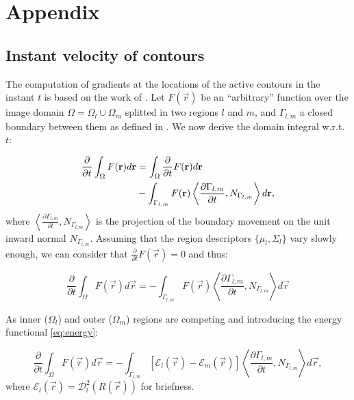 \renewcommand{\theequation}{A.\arabic{equation}}
\renewcommand{\thesubsection}{Appendix \arabic{subsection}}

\section*{Appendix}

\subsection{Instant velocity of contours}
\label{app:shape_priors}
The computation of gradients at the locations of the active contours in the
  instant $t$ is based on the work of \cite{herbulot_segmentation_2006}.
Let $F(\vec{r})$ be an ``arbitrary'' function over the image domain
  $\Omega = \Omega_l \cup \Omega_m$ splitted in two regions $l$ and
  $m$, and $\Gamma_{l,m}$ a closed boundary between them
  as defined in .
We now derive the domain integral w.r.t. $t$:

  \begin{align*}
  \frac{\partial}{\partial t} \int_\Omega F(\vec{r}) d\vec{r} &=
  \int_\Omega \frac{\partial}{\partial t}F(\vec{r}) d\vec{r} \notag\\
  &- \int_{\Gamma_{l,m}} F(\vec{r}) \left\langle \frac{\partial \Gamma_{l,m} }{\partial t},
  N_{\Gamma_{l,m}}\right\rangle d\vec{r},
  \end{align*}
%
  where $\left\langle\frac{\partial\Gamma_{l,m}}{\partial t}, N_{\Gamma_{l,m}}\right\rangle$ is
  the projection of the boundary movement on the unit inward normal $N_{\Gamma_{l,m}}$.
Assuming that the region descriptors $\{\mu_l, \Sigma_l\}$ vary slowly enough, we can consider
  that $\frac{\partial}{\partial t} F(\vec{r}) = 0$ and thus:

  \begin{equation}
  \frac{\partial}{\partial t} \int_\Omega F(\vec{r}) d\vec{r} =
  - \int_{\Gamma_{l,m}} F(\vec{r}) \left\langle \frac{\partial \Gamma_{l,m} }{\partial t},
  N_{\Gamma_{l,m}}\right\rangle d\vec{r}
  \label{eq:shape_gradient_orig}
  \end{equation}

  As inner ($\Omega_l$) and outer ($\Omega_m$) regions are competing and introducing
    the energy functional \eqref{eq:energy}:

    \begin{equation}
    \frac{\partial}{\partial t} \int_\Omega F(\vec{r}) d\vec{r} =
    - \int_{\Gamma_{l,m}} \left[ \mathcal{E}_{l}(\vec{r}) - \mathcal{E}_{m}(\vec{r}) \right]
    \left\langle \frac{\partial \Gamma_{l,m} }{\partial t},
  N_{\Gamma_{l,m}}\right\rangle d\vec{r},
  	\label{eq:shape_gradients}
    \end{equation}
%
    where $\mathcal{E}_l(\vec{r}) = \mathcal{D}^2_{l}(R(\vec{r}))$ for briefness.


